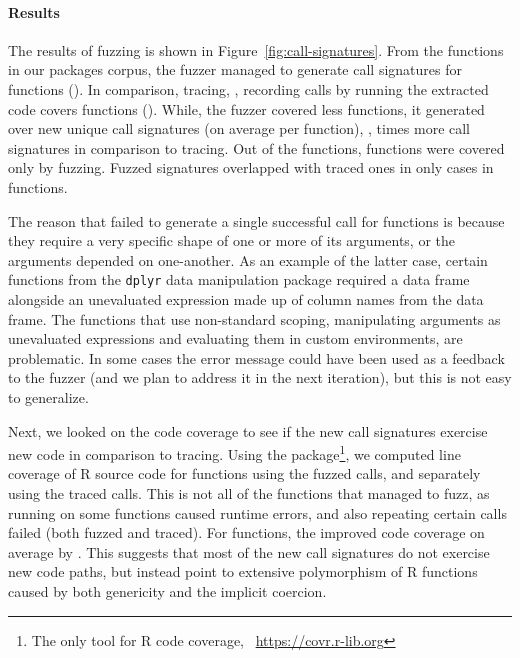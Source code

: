 \documentclass[sigplan,nonacm,anonymous,review]{acmart}
\begin{document}
\paragraph{Results}

The results of fuzzing is shown in Figure~\ref{fig:call-signatures}.
From the \UFNumFunctions functions in our \UFNumPackages packages corpus, the fuzzer managed to generate call signatures for \UFNumFunctionsSignatrSignature functions (\UFNumFunctionsSignatrToCorpusSignatureRatio).
In comparison, tracing, \Ie, recording calls by running the extracted code covers \UFNumFunctionsBaselineSignature functions (\UFNumFunctionsBaselineToCorpusSignatureRatio).
While, the fuzzer covered less functions, it generated over \UFSignatrSignaturesRnd new unique call signatures (on average \UFAvgNewSignatrSignature per function), \Ie, \UFSignatrBaselineSignaturesRatio times more call signatures in comparison to tracing.
Out of the \UFNumFunctionsSignatrSignature functions, \UFNumFunctionsOnlySignatrSignature functions were covered only by fuzzing.
Fuzzed signatures overlapped with traced ones in only \UFSharedSignatures cases in \UFSharedSignatuesFunctions functions.

The reason that \tool failed to generate a single successful call for \UFNumMissingFunctionSignatr functions is because they require a very specific shape of one or more of its arguments, or the arguments depended on one-another.
As an example of the latter case, certain functions from the {\tt dplyr} data manipulation package required a data frame alongside an unevaluated expression made up of column names from the data frame. 
The functions that use non-standard scoping, manipulating arguments as unevaluated expressions and evaluating them in custom environments, are problematic.
In some cases the error message could have been used as a feedback to the fuzzer (and we plan to address it in the next iteration), but this is not easy to generalize.

Next, we looked on the code coverage to see if the new call signatures exercise new code in comparison to tracing.
Using the  package\footnote{The only tool for R code coverage, \Cf~\url{https://covr.r-lib.org}}, we computed line coverage of R source code for \UFNumFunctionsWithBothCoverage functions using the fuzzed calls, and separately using the traced calls.
This is not all of the functions that \tool managed to fuzz, as running  on some functions caused runtime errors, and also repeating certain calls failed (both fuzzed and traced).
For \UFBetterCoverage functions, the \tool improved code coverage on average by \UFBetterCoverageMean.
This suggests that most of the new call signatures do not exercise new code paths, but instead point to extensive polymorphism of R functions caused by both genericity and the implicit coercion. 
\end{document}
